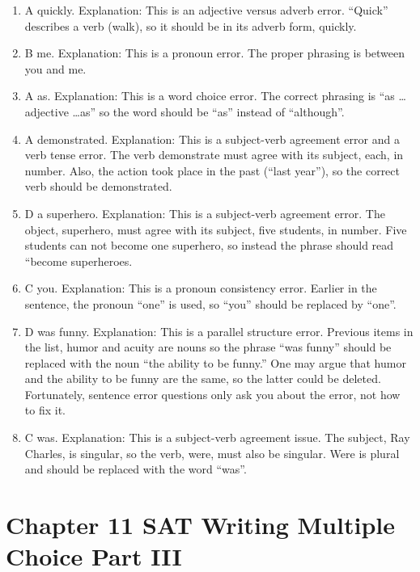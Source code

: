 \begin{enumerate}
\item A quickly. Explanation: This is an adjective versus adverb error. ``Quick'' describes a verb (walk), so it should be in its adverb form, quickly. 

\item B me. Explanation: This is a pronoun error. The proper phrasing is between you and me. 

\item A as. Explanation: This is a word choice error. The correct phrasing is ``as \ldots adjective \ldots as'' so the word should be ``as'' instead of ``although''. 

\item A demonstrated. Explanation: This is a subject-verb agreement error and a verb tense error. The verb demonstrate must agree with its subject, each, in number. Also, the action took place in the past (``last year''), so the correct verb should be demonstrated. 

\item D a superhero. Explanation: This is a subject-verb agreement error. The object, superhero, must agree with its subject, five students, in number. Five students can not become one superhero, so instead the phrase should read ``become superheroes. 

\item C you.  Explanation: This is a pronoun consistency error. Earlier in the sentence, the pronoun ``one'' is used, so ``you'' should be replaced by ``one''. 

\item D was funny. Explanation: This is a parallel structure error. Previous items in the list, humor and acuity are nouns so the phrase ``was funny'' should be replaced with the noun ``the ability to be funny.'' One may argue that humor and the ability to be funny are the same, so the latter could be deleted. Fortunately, sentence error questions only ask you about the error, not how to fix it. 

\item C was. Explanation: This is a subject-verb agreement issue. The subject, Ray Charles, is singular, so the verb, were, must also be singular. Were is plural and should be replaced with the word ``was''. 
\end{enumerate}



\section{Chapter 11 SAT Writing Multiple Choice Part III}


